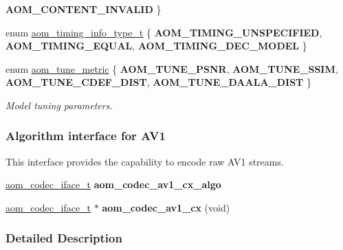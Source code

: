 \begin{DoxyCompactItemize}
{\bfseries A\+O\+M\+\_\+\+C\+O\+N\+T\+E\+N\+T\+\_\+\+I\+N\+V\+A\+L\+ID}
 \}
\item 
enum \hyperlink{group__aom__encoder_gad69c1d6aa10530991eeb1a3f0a818cba}{aom\+\_\+timing\+\_\+info\+\_\+type\+\_\+t} \{ {\bfseries A\+O\+M\+\_\+\+T\+I\+M\+I\+N\+G\+\_\+\+U\+N\+S\+P\+E\+C\+I\+F\+I\+ED}, 
{\bfseries A\+O\+M\+\_\+\+T\+I\+M\+I\+N\+G\+\_\+\+E\+Q\+U\+AL}, 
{\bfseries A\+O\+M\+\_\+\+T\+I\+M\+I\+N\+G\+\_\+\+D\+E\+C\+\_\+\+M\+O\+D\+EL}
 \}
\item 
enum \hyperlink{group__aom__encoder_gaafd352cc596fab5388558950f8bbe739}{aom\+\_\+tune\+\_\+metric} \{ {\bfseries A\+O\+M\+\_\+\+T\+U\+N\+E\+\_\+\+P\+S\+NR}, 
{\bfseries A\+O\+M\+\_\+\+T\+U\+N\+E\+\_\+\+S\+S\+IM}, 
{\bfseries A\+O\+M\+\_\+\+T\+U\+N\+E\+\_\+\+C\+D\+E\+F\+\_\+\+D\+I\+ST}, 
{\bfseries A\+O\+M\+\_\+\+T\+U\+N\+E\+\_\+\+D\+A\+A\+L\+A\+\_\+\+D\+I\+ST}
 \}\begin{DoxyCompactList}\small\item\em Model tuning parameters. \end{DoxyCompactList}
\end{DoxyCompactItemize}
\subsubsection*{Algorithm interface for A\+V1}
\label{_amgrp8c574bd9a585a04008b0d15257056884}%
This interface provides the capability to encode raw A\+V1 streams. \begin{DoxyCompactItemize}
\item 
\hyperlink{group__codec_ga4ef55b44c762836d1550e11921bed403}{aom\+\_\+codec\+\_\+iface\+\_\+t} {\bfseries aom\+\_\+codec\+\_\+av1\+\_\+cx\+\_\+algo}\hypertarget{group__aom__encoder_ga18350b1c0642494e2b1a970104b2e8b9}{}\label{group__aom__encoder_ga18350b1c0642494e2b1a970104b2e8b9}

\item 
\hyperlink{group__codec_ga4ef55b44c762836d1550e11921bed403}{aom\+\_\+codec\+\_\+iface\+\_\+t} $\ast$ {\bfseries aom\+\_\+codec\+\_\+av1\+\_\+cx} (void)\hypertarget{group__aom__encoder_ga5b742eec203f55a95cc404f41c0166d8}{}\label{group__aom__encoder_ga5b742eec203f55a95cc404f41c0166d8}

\end{DoxyCompactItemize}


\subsubsection{Detailed Description}


